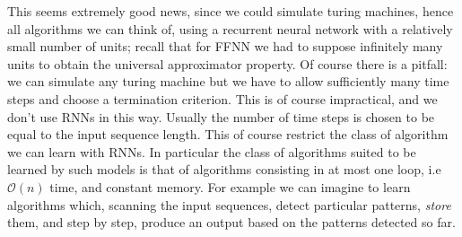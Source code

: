 This seems extremely good news, since we could simulate turing machines, hence all algorithms we can think of, using a recurrent neural network with a relatively small number of units; 
recall that for FFNN we had to suppose infinitely many units to obtain the universal approximator property.
Of course there is a pitfall: we can simulate any turing machine but we have to allow sufficiently many time steps and choose a termination criterion.
This is of course impractical, and we don't use RNNs in this way. Usually the number of time steps is chosen to be equal to the input sequence length. This of course restrict the class of algorithm we can learn with RNNs. 
In particular the class of algorithms suited to be learned by such models is that of algorithms consisting in at most one loop, i.e $\mathcal{O}(n)$ time, and constant memory. For example we can imagine to learn algorithms which, scanning the input sequences, detect particular patterns, \textit{store} them, and step by step, produce an output based on the patterns detected so far.





